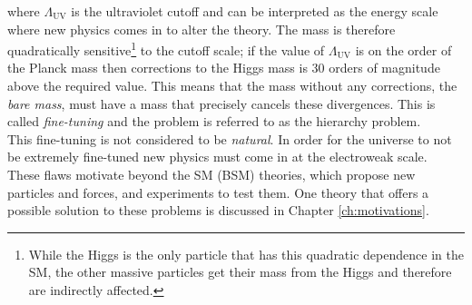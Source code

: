 where $\Lambda_{\mathrm{UV}}$ is the ultraviolet cutoff and can be interpreted as the energy scale where new physics comes in to alter the theory.   The mass is therefore quadratically sensitive\footnote{While the Higgs is the only particle that has this quadratic dependence in the SM, the other massive particles get their mass from the Higgs and therefore are indirectly affected.} to the cutoff scale; if the value of $\Lambda_{\mathrm{UV}}$ is on the order of the Planck mass then corrections to the Higgs mass is 30 orders of magnitude above the required value.  This means that the mass without any corrections, the \textit{bare mass}, must have a mass that precisely cancels these divergences.  This is called \textit{fine-tuning} and the problem is referred to as the hierarchy problem.  \\

This fine-tuning is not considered to be \textit{natural}.  In order for the universe to not be extremely fine-tuned new physics must come in at the electroweak scale.  \\

These flaws motivate beyond the SM (BSM) theories, which propose new particles and forces, and experiments to test them.  One theory that offers a possible solution to these problems is discussed in Chapter \ref{ch:motivations}.




	











%
%
%
